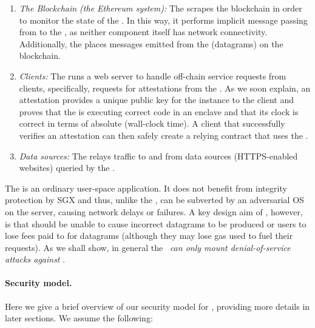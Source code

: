 \begin{enumerate}
\item {\em The Blockchain (the Ethereum system):}  The \medname scrapes the blockchain in order to monitor the state of the \tcontract  \tcont. In this way, it performs implicit message passing from \tcont to the \encname, as neither component itself has network connectivity. Additionally, the \medname places messages emitted from the \encname (datagrams) on the blockchain.
\item {\em Clients:} The \medname runs a web server to handle off-chain service requests from clients, specifically, requests for attestations from the \encname. As we soon explain, an attestation provides a unique public key for the \encname instance to the  client and proves that the \encname is executing correct code in an enclave and that its clock is correct in terms of absolute (wall-clock time). A client that successfully verifies an attestation can then safely create a relying contract \reqcont that uses the \tc.
\item {\em Data sources:} The \medname relays traffic to and from data sources (HTTPS-enabled websites) queried by the \encname. 
\end{enumerate}

The \medname is an ordinary user-space application. It does not benefit from integrity protection by SGX and thus, unlike the \encname, can be subverted by an adversarial OS on the \tc server, causing network delays or failures. A key design aim of \tc, however, is that \medname should be unable to cause incorrect datagrams to be produced or users to lose fees paid to \tc for datagrams (although they may lose gas used to fuel their requests). As we shall show, in general the \medname~{\em can only mount denial-of-service attacks against \tc}. 

\vspace{-2mm}
\paragraph{Security model.}

Here we give a brief overview of our security model for \tc, providing more details in later sections. We assume the following:

